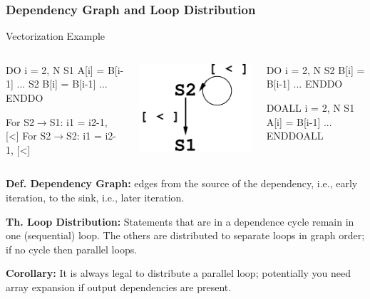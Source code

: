 \documentclass{beamer}
\newcommand{\emp}[1]{\textcolor{DikuRed}{ #1}}
\newcommand{\emphh}[1]{\textcolor{CosGreen}{ #1}}
\newcommand{\mymath}[1]{$ #1 $}
\begin{document}
\begin{frame}[fragile,t]
  \frametitle{Dependency Graph and Loop Distribution} %

\begin{block}{Vectorization Example}
\begin{columns}
\begin{colorcode}[fontsize=\scriptsize]
  DO i = 2, N
\emp{S1  A[i] = B[i-1] ...}
\alert{S2  B[i] = B[i-1] ...}
  ENDDO  

For S2\mymath{\rightarrow}S1: i1 = i2-1, \emp{[<]}
For S2\mymath{\rightarrow}S2: i1 = i2-1, \emp{[<]}
\end{colorcode} 
\includegraphics[height=12ex]{ParTeaserFigs/LoopDistr}  
\begin{colorcode}[fontsize=\scriptsize]
  \alert{DO} i = 2, N
S2  B[i] = B[i-1] ...
  \alert{ENDDO}

  \emphh{DOALL} i = 2, N
\emp{S1  A[i] = B[i-1] ...}
  \emphh{ENDDOALL}
\end{colorcode}
\end{columns}
\end{block}

\smallskip

{\bf Def. Dependency Graph:} edges from the source of the dependency, i.e., early iteration, 
to the sink, i.e., later iteration. 

\smallskip

{\bf Th. Loop Distribution:} Statements that are in a dependence cycle remain in one (sequential) loop.
The others are distributed to separate loops in graph order; if no cycle then parallel loops.

\bigskip

{\bf Corollary:} It is always legal to distribute a parallel loop; potentially you need
array expansion if output dependencies are present.
\end{frame}
\end{document}
